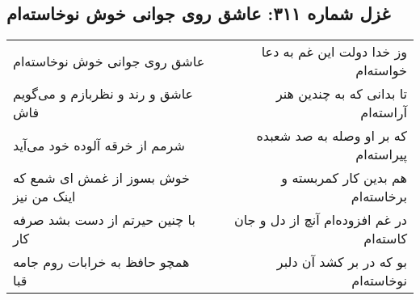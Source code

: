 \begin{center}
\section*{غزل شماره ۳۱۱: عاشق روی جوانی خوش نوخاسته‌ام}
\label{sec:sh311}
\begin{longtable}{l p{0.5cm} r}
عاشق روی جوانی خوش نوخاسته‌ام
&&
وز خدا دولت این غم به دعا خواسته‌ام
\\
عاشق و رند و نظربازم و می‌گویم فاش
&&
تا بدانی که به چندین هنر آراسته‌ام
\\
شرمم از خرقه آلوده خود می‌آید
&&
که بر او وصله به صد شعبده پیراسته‌ام
\\
خوش بسوز از غمش ای شمع که اینک من نیز
&&
هم بدین کار کمربسته و برخاسته‌ام
\\
با چنین حیرتم از دست بشد صرفه کار
&&
در غم افزوده‌ام آنچ از دل و جان کاسته‌ام
\\
همچو حافظ به خرابات روم جامه قبا
&&
بو که در بر کشد آن دلبر نوخاسته‌ام
\\
\end{longtable}
\end{center}
